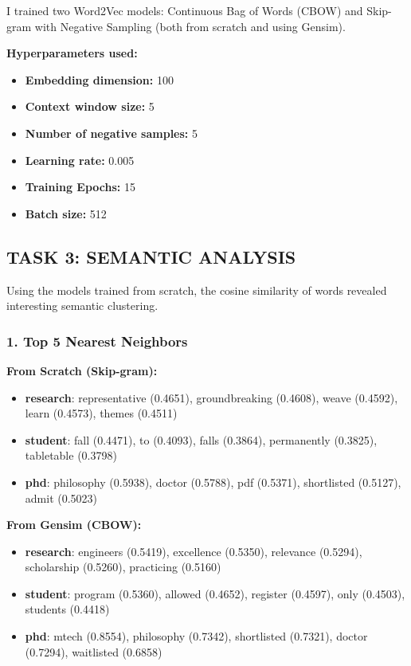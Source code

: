 \documentclass{article}
\begin{document}
I trained two Word2Vec models: Continuous Bag of Words (CBOW) and Skip-gram with Negative Sampling (both from scratch and using Gensim). 

\textbf{Hyperparameters used:}
\begin{itemize}
    \item \textbf{Embedding dimension:} 100
    \item \textbf{Context window size:} 5
    \item \textbf{Number of negative samples:} 5
    \item \textbf{Learning rate:} 0.005
    \item \textbf{Training Epochs:} 15
    \item \textbf{Batch size:} 512
\end{itemize}

\subsection*{TASK 3: SEMANTIC ANALYSIS}

Using the models trained from scratch, the cosine similarity of words revealed interesting semantic clustering.

\subsubsection*{1. Top 5 Nearest Neighbors}

\textbf{From Scratch (Skip-gram):}
\begin{itemize}
    \item \textbf{research}: representative (0.4651), groundbreaking (0.4608), weave (0.4592), learn (0.4573), themes (0.4511)
    \item \textbf{student}: fall (0.4471), to (0.4093), falls (0.3864), permanently (0.3825), tabletable (0.3798)
    \item \textbf{phd}: philosophy (0.5938), doctor (0.5788), pdf (0.5371), shortlisted (0.5127), admit (0.5023)
\end{itemize}

\textbf{From Gensim (CBOW):}
\begin{itemize}
    \item \textbf{research}: engineers (0.5419), excellence (0.5350), relevance (0.5294), scholarship (0.5260), practicing (0.5160)
    \item \textbf{student}: program (0.5360), allowed (0.4652), register (0.4597), only (0.4503), students (0.4418)
    \item \textbf{phd}: mtech (0.8554), philosophy (0.7342), shortlisted (0.7321), doctor (0.7294), waitlisted (0.6858)
\end{itemize}
\end{document}
